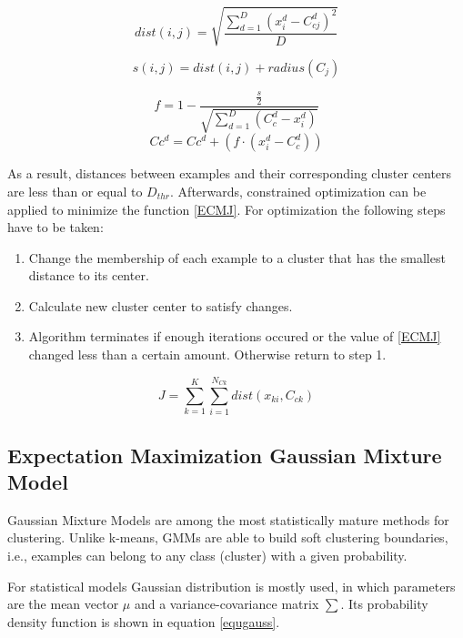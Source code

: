 \documentclass[conference]{IEEEtran}
\begin{document}
\begin{equation}\label{ECMdist}
dist(i,j) = \sqrt{ \frac {\sum_{d=1}^{D} (x_i^d - C_{cj}^d)^2} {D}}
\end{equation}

\begin{equation}\label{ECMequ1}
s(i, j) = dist(i,j) + radius(C_j)
\end{equation}

\begin{equation}\label{ECMequ2}
f = 1 - \frac {\frac {s} {2}} {\sqrt{ \sum_{d=1}^{D} (C_c^d - x_i^d)}}
\end{equation}
\begin{equation}\label{ECMequ3}
Cc^d = Cc^d + (f \cdot (x_i^d - C_c^d))
\end{equation}

As a result, distances between examples and their corresponding cluster centers are less than or equal to $D_{thr}$.
Afterwards, constrained optimization can be applied to minimize the function \ref{ECMJ}. For optimization the following steps have to be taken:
\begin{enumerate}
	\item Change the membership of each example to a cluster that has the smallest distance to its center.
	\item Calculate new cluster center to satisfy changes.
	\item Algorithm terminates if enough iterations occured or the value of \ref{ECMJ} changed less than a certain amount.
		Otherwise return to step 1.
\end{enumerate}

\begin{equation}\label{ECMJ}
	J = \sum_{k=1}^K \sum_{i=1}^{N_{Ck}} dist(x_{ki}, C_{ck})
\end{equation}


\subsection{Expectation Maximization Gaussian Mixture Model}

Gaussian Mixture Models are among the most statistically mature methods for clustering. Unlike k-means,
GMMs are able to build soft clustering boundaries, i.e., examples can belong to any class (cluster) with a given probability.

For statistical models Gaussian distribution is mostly used, in which parameters are the mean vector $\mu$ and a
variance-covariance matrix $\sum$. Its probability density function is shown in equation \ref{equgauss}.
\end{document}
